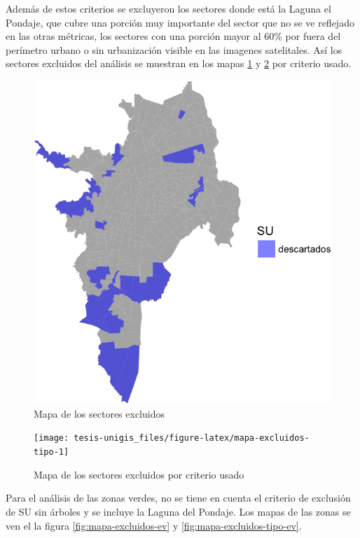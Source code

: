 \documentclass[12pt,]{book}
\begin{document}
Además de estos criterios se excluyeron los sectores donde está la
Laguna el Pondaje, que cubre una porción muy importante del sector que
no se ve reflejado en las otras métricas, los sectores con una porción
mayor al 60\% por fuera del perímetro urbano o sin urbanización visible
en las imagenes satelitales. Así los sectores excluidos del análisis se
muestran en los mapas \ref{fig:mapa-excluidos} y
\ref{fig:mapa-excluidos-tipo} por criterio usado.

\begin{figure}
\includegraphics[width=1\linewidth]{tesis-unigis_files/figure-latex/mapa-excluidos-1} \caption{Mapa de los sectores excluidos}\label{fig:mapa-excluidos}
\end{figure}

\begin{figure}
\texttt{[image: tesis-unigis\_files/figure-latex/mapa-excluidos-tipo-1]} \caption{Mapa de los sectores excluidos por criterio usado}\label{fig:mapa-excluidos-tipo}
\end{figure}

Para el análisis de las zonas verdes, no se tiene en cuenta el criterio
de exclusión de SU sin árboles y se incluye la Laguna del Pondaje. Los
mapas de las zonas se ven el la figura \ref{fig:mapa-excluidos-ev} y
\ref{fig:mapa-excluidos-tipo-ev}.
\end{document}
